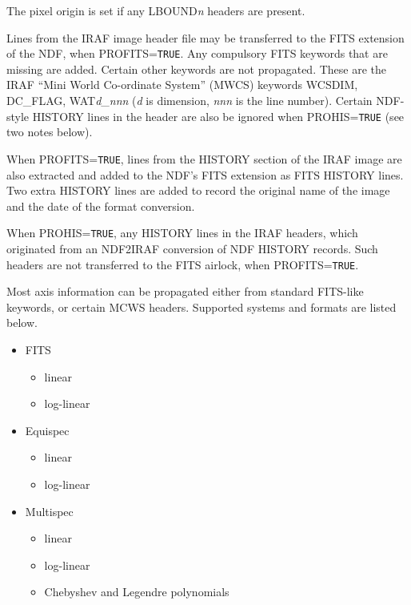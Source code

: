 \documentclass[twoside,11pt]{article}
\newcommand{\ssthitemlist}[1]{
  \latexonly{
  \mbox{} \\
  \vspace{-3.5ex}
  }
  \begin{itemize}
     #1
  \end{itemize}
}
\newcommand{\sstitem}{\item}
\newcommand{\sstitem}{\item}
\begin{document}
{{{         \sstitem
         The pixel origin is set if any LBOUND\textit{n} headers are present.

         \sstitem
         Lines from the IRAF image header file may be transferred to
         the FITS extension of the NDF, when PROFITS=\texttt{TRUE}.  Any
         compulsory FITS keywords that are missing are added.  Certain
         other keywords are not propagated.  These are the IRAF ``Mini
         World Co-ordinate System'' (MWCS) keywords WCSDIM, DC\_FLAG,
         WAT\textit{d}\_\textit{nnn} (\textit{d} is dimension, \textit{nnn}
         is the line number).
         Certain NDF-style HISTORY lines in the header are also
         be ignored when PROHIS=\texttt{TRUE} (see two notes below).

         \sstitem
         When PROFITS=\texttt{TRUE}, lines from the HISTORY section of the IRAF
         image are also extracted and added to the NDF's FITS extension as
         FITS HISTORY lines.  Two extra HISTORY lines are added to record
         the original name of the image and the date of the format
         conversion.

         \sstitem
         When PROHIS=\texttt{TRUE}, any HISTORY lines in the IRAF headers, which
         originated from an NDF2IRAF conversion of NDF HISTORY records.
         Such headers are not transferred to the FITS airlock, when
         PROFITS=\texttt{TRUE}.

         \sstitem
         Most axis information can be propagated either from standard
         FITS-like keywords, or certain MCWS headers.  Supported systems
         and formats are listed below.
         \ssthitemlist{

            \sstitem
            FITS
            \ssthitemlist{
               \sstitem
               linear

               \sstitem
               log-linear
            }

            \sstitem
            Equispec
            \ssthitemlist{

               \sstitem
               linear

               \sstitem
               log-linear
            }

            \sstitem
            Multispec
            \ssthitemlist{

               \sstitem
               linear

               \sstitem
               log-linear

               \sstitem
               Chebyshev and Legendre polynomials

}}}}}
\end{document}

